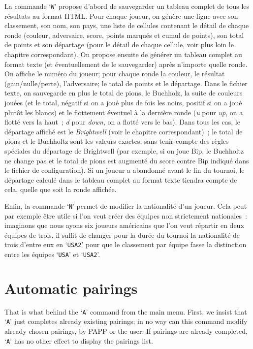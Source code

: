 \documentclass[10pt]{article}
\begin{document}
    La commande `\verb|W|' propose d'abord de sauvegarder un tableau
complet de tous les résultats au format HTML. Pour chaque joueur,
on génère une ligne avec son classement, son nom, son pays,
une liste de cellules contenant le détail de chaque ronde
(couleur, adversaire, score, points marqués et cumul de points),
son total de points et son départage (pour le détail de chaque
cellule, voir plus loin le chapitre correspondant). On propose ensuite de
générer un tableau complet au format texte (et éventuellement de
le sauvegarder) après n'importe quelle ronde. On affiche le numéro
du joueur; pour chaque ronde la couleur, le résultat (gain/nulle/perte),
l'adversaire; le total de points et le départage. Dans le fichier
texte, on sauvegarde en plus le total de pions, le Buchholz, la suite
de couleurs jouées (et le total, négatif si on a joué plus de fois
les noirs, positif si on a joué plut\^ot les blancs) et le flottement
éventuel à la dernière ronde ({\em u} pour {\em up}, on a flotté
vers la haut~; {\em d} pour {\em down}, on a flotté vers le bas).
Dans tous les cas, le départage affiché est le {\em Brightwell}
(voir le chapitre correspondant)~; le total de pions et le Buchholtz
sont les valeurs exactes, sans tenir compte des règles spéciales
du départage de Brightwell (par exemple, si on joue Bip, le Buchholtz
ne change pas et le total de pions est augmenté du score contre Bip
indiqué dans le fichier de configuration). Si un joueur a abandonné
avant le fin du tournoi, le départage calculé dans le tableau complet
au format texte tiendra compte de cela, quelle que soit la ronde affichée.

Enfin, la commande `\verb|N|' permet de modifier la nationalité d'un
joueur. Cela peut par exemple être utile si l'on veut créer des
équipes non strictement nationales~: imaginons que nous ayons six 
joueurs américains que l'on veut répartir en deux équipes de trois, 
il suffit de changer pour la durée du tournoi la nationalité de 
trois d'entre eux en `\verb|USA2|' pour que le classement par équipe
fasse la distinction entre les équipes `\verb|USA|' et `\verb|USA2|'.





\section{Automatic pairings}

That is what behind the `\verb|A|' command from the main menu. First, we insist that `\verb|A|' just completes
already existing pairings; in no way can this command modify already chosen pairings, by PAPP or the user. If pairings are already completed, `\verb|A|' has no other effect to display the pairings list.
\end{document}
